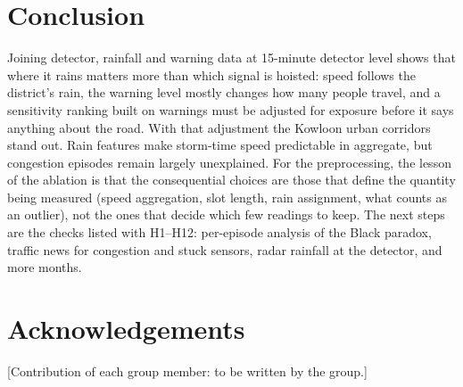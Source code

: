 \documentclass[conference]{IEEEtran}
\begin{document}
\section{Conclusion}
Joining detector, rainfall and warning data at 15-minute detector level shows that where it
rains matters more than which signal is hoisted: speed follows the district's rain, the
warning level mostly changes how many people travel, and a sensitivity ranking built on
warnings must be adjusted for exposure before it says anything about the road. With that
adjustment the Kowloon urban corridors stand out. Rain features make storm-time speed
predictable in aggregate, but congestion episodes remain largely unexplained. For the
preprocessing, the lesson of the ablation is that the consequential choices are those that
define the quantity being measured (speed aggregation, slot length, rain assignment, what
counts as an outlier), not the ones that decide which few readings to keep. The next steps are
the checks listed with H1--H12: per-episode analysis of the Black paradox, traffic news for
congestion and stuck sensors, radar rainfall at the detector, and more months.

\section*{Acknowledgements}
[Contribution of each group member: to be written by the group.]



\end{document}
